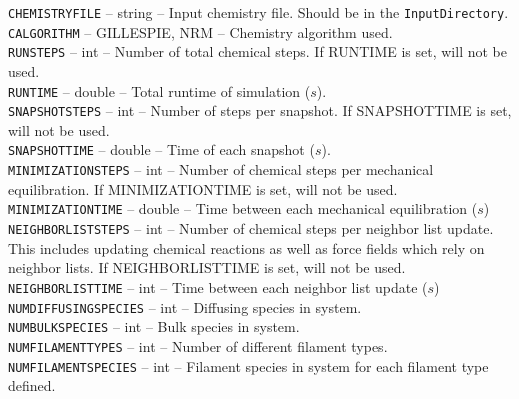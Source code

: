 \documentclass[11pt, oneside]{article}   	%
\begin{document}
\small
    \noindent\texttt{CHEMISTRYFILE} -- string -- Input chemistry file. Should be in the \texttt{InputDirectory}. \\
   
     \noindent\texttt{CALGORITHM} -- GILLESPIE, NRM -- Chemistry algorithm used. \\
   
     \noindent\texttt{RUNSTEPS} -- int -- Number of total chemical steps. If RUNTIME is set, will not be used. \\
   
     \noindent\texttt{RUNTIME} -- double -- Total runtime of simulation ($s$). \\
   
     \noindent\texttt{SNAPSHOTSTEPS} -- int -- Number of steps per snapshot. If SNAPSHOTTIME is set, will not be used. \\
   
     \noindent\texttt{SNAPSHOTTIME} -- double -- Time of each snapshot ($s$). \\
        
    \noindent\texttt{MINIMIZATIONSTEPS} -- int -- Number of chemical steps per mechanical equilibration. If MINIMIZATIONTIME is set, will not be used. \\
   
     \noindent\texttt{MINIMIZATIONTIME} -- double -- Time between each mechanical equilibration ($s$) \\

     \noindent\texttt{NEIGHBORLISTSTEPS} -- int -- Number of chemical steps per neighbor list update. This includes updating
   chemical reactions as well as force fields which rely on neighbor lists. If NEIGHBORLISTTIME is set, will not be used. \\
   
     \noindent\texttt{NEIGHBORLISTTIME} -- int -- Time between each neighbor list update ($s$) \\
   
     \noindent\texttt{NUMDIFFUSINGSPECIES} -- int -- Diffusing species in system. \\
   
     \noindent\texttt{NUMBULKSPECIES} -- int -- Bulk species in system. \\
   
      \noindent\texttt{NUMFILAMENTTYPES} -- int -- Number of different filament types. \\
   
     \noindent\texttt{NUMFILAMENTSPECIES} -- int -- Filament species in system for each filament type defined. \\
   
\end{document}
